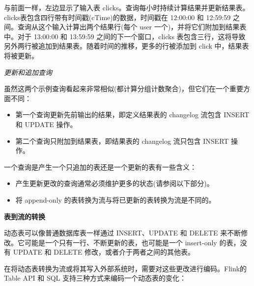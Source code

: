 \documentclass[cn,11pt,chinese]{elegantbook}
\begin{document}
与前面一样，左边显示了输入表 clicks。查询每小时持续计算结果并更新结果表。clicks表包含四行带有时间戳(cTime)的数据，时间戳在 12:00:00 和 12:59:59 之间。查询从这个输入计算出两个结果行(每个 user 一个)，并将它们附加到结果表中。对于 13:00:00 和 13:59:59 之间的下一个窗口，clicks 表包含三行，这将导致另外两行被追加到结果表。随着时间的推移，更多的行被添加到 click 中，结果表将被更新。

\textit{更新和追加查询}

虽然这两个示例查询看起来非常相似(都计算分组计数聚合)，但它们在一个重要方面不同：

\begin{itemize}
    \item 第一个查询更新先前输出的结果，即定义结果表的 changelog 流包含 INSERT 和 UPDATE 操作。
    \item 第二个查询只附加到结果表，即结果表的 changelog 流只包含 INSERT 操作。
\end{itemize}

一个查询是产生一个只追加的表还是一个更新的表有一些含义：

\begin{itemize}
    \item 产生更新更改的查询通常必须维护更多的状态(请参阅以下部分)。
    \item 将 append-only 的表转换为流与将已更新的表转换为流是不同的。
\end{itemize}

\textbf{表到流的转换}

动态表可以像普通数据库表一样通过 INSERT、UPDATE 和 DELETE 来不断修改。它可能是一个只有一行、不断更新的表，也可能是一个 insert-only 的表，没有 UPDATE 和 DELETE 修改，或者介于两者之间的其他表。

在将动态表转换为流或将其写入外部系统时，需要对这些更改进行编码。Flink的 Table API 和 SQL 支持三种方式来编码一个动态表的变化：
\end{document}
